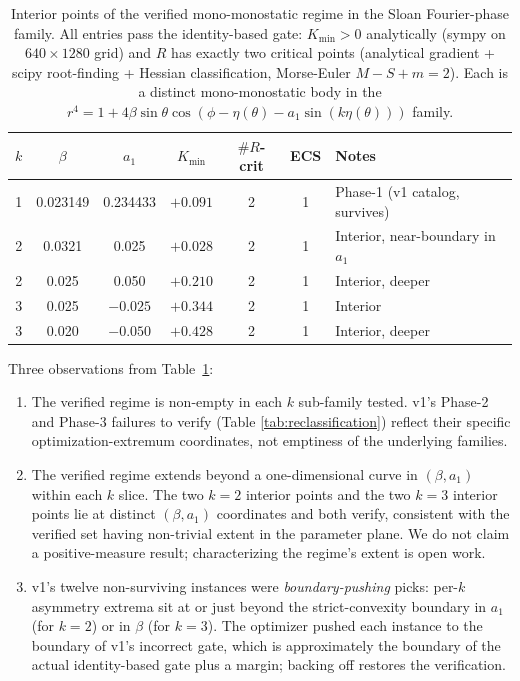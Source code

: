 \documentclass[11pt,a4paper]{article}
\begin{document}
\begin{table}[h]
\centering
\caption{Interior points of the verified mono-monostatic regime
in the Sloan Fourier-phase family. All entries pass the
identity-based gate: $K_{\min} > 0$ analytically (sympy on
$640 \times 1280$ grid) and $R$ has exactly two critical points
(analytical gradient + scipy root-finding + Hessian classification,
Morse-Euler $M-S+m=2$). Each is a distinct mono-monostatic
body in the $r^4 = 1 + 4\beta\sin\theta\cos(\phi - \eta(\theta)
- a_1 \sin(k\eta(\theta)))$ family.}
\label{tab:regime_interior}
\begin{tabular}{ccccccl}
\toprule
$k$ & $\beta$ & $a_1$ & $K_{\min}$ & $\#R$-crit & ECS & Notes \\
\midrule
1 & 0.023149 &  0.234433 & $+0.091$ & 2 & 1 & Phase-1 (v1 catalog, survives) \\
2 & 0.0321   &  0.025    & $+0.028$ & 2 & 1 & Interior, near-boundary in $a_1$ \\
2 & 0.025    &  0.050    & $+0.210$ & 2 & 1 & Interior, deeper \\
3 & 0.025    & $-0.025$  & $+0.344$ & 2 & 1 & Interior \\
3 & 0.020    & $-0.050$  & $+0.428$ & 2 & 1 & Interior, deeper \\
\bottomrule
\end{tabular}
\end{table}

Three observations from Table~\ref{tab:regime_interior}:

\begin{enumerate}[nosep]
\item The verified regime is non-empty in each $k$ sub-family
  tested. v1's Phase-2 and Phase-3 failures to verify (Table
  \ref{tab:reclassification}) reflect their specific
  optimization-extremum coordinates, not emptiness of the underlying
  families.
\item The verified regime extends beyond a one-dimensional curve in
  $(\beta, a_1)$ within each $k$ slice. The two $k=2$ interior points
  and the two $k=3$ interior points lie at distinct $(\beta, a_1)$
  coordinates and both verify, consistent with the verified set having
  non-trivial extent in the parameter plane. We do not claim a
  positive-measure result; characterizing the regime's extent is open
  work.
\item v1's twelve non-surviving instances were
  \emph{boundary-pushing} picks: per-$k$ asymmetry extrema sit at
  or just beyond the strict-convexity boundary in $a_1$ (for $k=2$)
  or in $\beta$ (for $k=3$). The optimizer pushed each instance to
  the boundary of v1's incorrect gate, which is approximately the
  boundary of the actual identity-based gate plus a margin; backing
  off restores the verification.
\end{enumerate}
\end{document}
